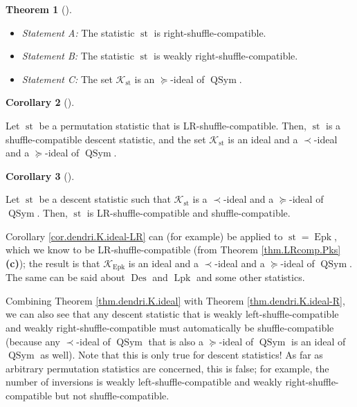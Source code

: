 \documentclass[numbers=enddot,12pt,final,onecolumn,notitlepage]{scrartcl}%
\theoremstyle{definition}
\newtheorem{theo}{Theorem}[section]
\newenvironment{theorem}[1][]
{\begin{theo}[#1]\begin{leftbar}}
{\end{leftbar}\end{theo}}
\newtheorem{coro}[theo]{Corollary}
\newenvironment{corollary}[1][]
{\begin{coro}[#1]\begin{leftbar}}
{\end{leftbar}\end{coro}}
\newenvironment{vershort}{}{}
\begin{document}
\begin{vershort}
\begin{theorem}
\begin{itemize}
\item \textit{Statement A:} The statistic $\operatorname{st}$ is right-shuffle-compatible.

\item \textit{Statement B:} The statistic $\operatorname{st}$ is weakly right-shuffle-compatible.

\item \textit{Statement C:} The set $\mathcal{K}_{\operatorname{st}}$ is an
$\left.  \succeq\right.  $-ideal of $\operatorname*{QSym}$.
\end{itemize}
\end{theorem}

\begin{corollary}
\label{cor.dendri.K.ideal-LR}Let $\operatorname{st}$ be a permutation
statistic that is LR-shuffle-compatible. Then, $\operatorname{st}$ is a
shuffle-compatible descent statistic, and the set $\mathcal{K}%
_{\operatorname{st}}$ is an ideal and a $\left.  \prec\right.  $-ideal and a
$\left.  \succeq\right.  $-ideal of $\operatorname*{QSym}$.
\end{corollary}

\begin{corollary}
\label{cor.dendri.K.ideal-LRi}Let $\operatorname{st}$ be a descent statistic
such that $\mathcal{K}_{\operatorname{st}}$ is a $\left.  \prec\right.
$-ideal and a $\left.  \succeq\right.  $-ideal of $\operatorname*{QSym}$.
Then, $\operatorname{st}$ is LR-shuffle-compatible and shuffle-compatible.
\end{corollary}

Corollary \ref{cor.dendri.K.ideal-LR} can (for example) be applied to
$\operatorname{st}=\operatorname{Epk}$, which we know to be
LR-shuffle-compatible (from Theorem \ref{thm.LRcomp.Pks} \textbf{(c)}); the
result is that $\mathcal{K}_{\operatorname{Epk}}$ is an ideal and a $\left.
\prec\right.  $-ideal and a $\left.  \succeq\right.  $-ideal of
$\operatorname*{QSym}$. The same can be said about $\operatorname{Des}$ and
$\operatorname*{Lpk}$ and some other statistics.

Combining Theorem \ref{thm.dendri.K.ideal} with Theorem
\ref{thm.dendri.K.ideal-R}, we can also see that any descent statistic that is
weakly left-shuffle-compatible and weakly right-shuffle-compatible must
automatically be shuffle-compatible (because any $\left.  \prec\right.
$-ideal of $\operatorname*{QSym}$ that is also a $\left.  \succeq\right.
$-ideal of $\operatorname*{QSym}$ is an ideal of $\operatorname*{QSym}$ as
well). Note that this is only true for descent statistics! As far as arbitrary
permutation statistics are concerned, this is false; for example, the number
of inversions is weakly left-shuffle-compatible and weakly
right-shuffle-compatible but not shuffle-compatible.


\end{vershort}
\end{document}
